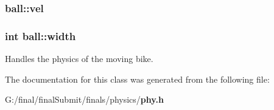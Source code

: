 \subsubsection[{vel}]{ ball\-::vel}\label{classball_abb8761cb8dc51768c1b56be817d325b8}
\subsubsection[{width}]{\setlength{\rightskip}{0pt plus 5cm}int ball\-::width}\label{classball_a7ef337f3c262f609fe1f37c0df3c5f3a}


Handles the physics of the moving bike. 



The documentation for this class was generated from the following file\-:\begin{DoxyCompactItemize}
\item 
G\-:/final/final\-Submit/finals/physics/{\bf phy.\-h}\end{DoxyCompactItemize}

